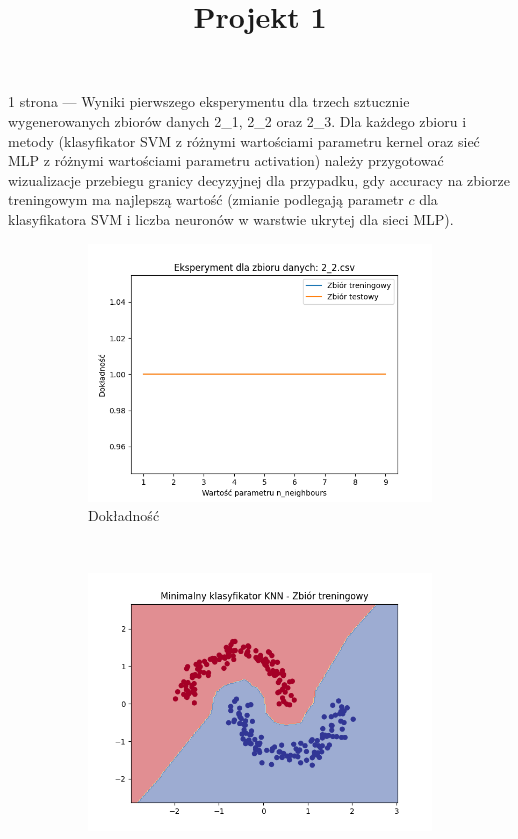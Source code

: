 \documentclass[12pt]{article}
\title{Projekt 1}
\newcommand*{\subfigwidth}{0.15\textwidth}
\begin{document}
\maketitle

1 strona --- Wyniki pierwszego eksperymentu dla trzech sztucznie wygenerowanych zbiorów danych 2\_1, 2\_2 oraz 2\_3. 
Dla każdego zbioru i metody (klasyfikator SVM z różnymi wartościami parametru kernel oraz sieć MLP z różnymi wartościami parametru activation) 
należy przygotować wizualizacje przebiegu granicy decyzyjnej dla przypadku, gdy accuracy na zbiorze treningowym ma najlepszą wartość 
(zmianie podlegają parametr $c$ dla klasyfikatora SVM i liczba neuronów w warstwie ukrytej dla sieci MLP).


\clearpage

\begin{figure}[H]\centering
    \begin{subfigure}[t]{\subfigwidth}
        \includegraphics[width=\linewidth]{img/exp_2/knn/2_2/accuracy.png}
        \caption{Dokładność}
    \end{subfigure}
    \\
    \begin{subfigure}[t]{\subfigwidth}
        \includegraphics[width=\linewidth]{img/exp_2/knn/2_2/min/train_boundary.png}

\end{subfigure}
\end{figure}
\end{document}
